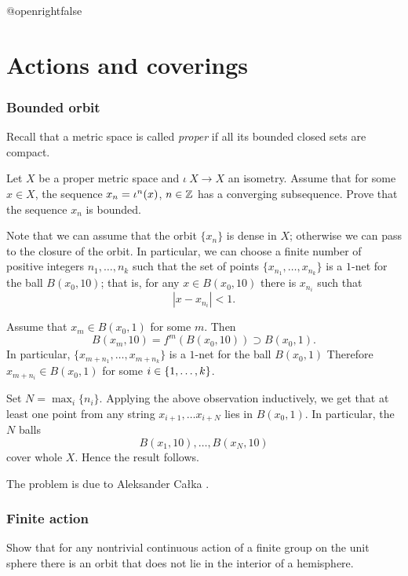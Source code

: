 \csname @openrightfalse\endcsname
\chapter{Actions and coverings}

\subsection*{Bounded orbit}
\label{Bounded orbit}

Recall that a metric space is called \emph{proper} if all its bounded closed sets are compact.

\begin{pr} Let $X$ be a 
proper metric space 
and $\iota\:X\to X$ an isometry.
Assume that for some $x\in X$, the sequence $x_n\z=\iota^n(x)$, $n\in\mathbb{Z}$ has a converging subsequence.
Prove that the sequence $x_n$ is bounded.
\end{pr}

Note that we can assume that the orbit $\{x_n\}$ is dense in $X$;
otherwise we can pass to the closure of the orbit.
In particular, we can choose a finite number of positive integers $n_1,\dots,n_k$
such that the set of points $\{x_{n_1},\dots,x_{n_k}\}$ is a $1$-net for the ball $B(x_0,10)$;
that is, for any $x\in B(x_0,10)$ there is $x_{n_i}$ such that
\[|x-x_{n_i}|<1.\]

Assume that $x_m\in B(x_0,1)$ for some $m$.
Then 
\[B(x_m,10)=f^m( B(x_0,10))\supset B(x_0,1).\] 
In particular, $\{x_{m+n_1},\dots,x_{m+n_k}\}$ is a $1$-net for the ball $B(x_0,1)$
Therefore $x_{m+n_i}\in B(x_0,1)$ for some $i\z\in\{1,\dots,k\}$.

Set $N=\max_i\{n_i\}$.
Applying the above observation inductively, we get that at least one point from any string $x_{i+1},\dots x_{i+N}$ lies in $B(x_0,1)$.
In particular, the $N$ balls
\[B(x_1,10),\dots,B(x_N,10)\]
cover whole $X$.
Hence the result follows.\qeds

The problem is due to Aleksander Ca{\l}ka \cite{calka}.

\subsection*{Finite action}\label{Finite action}

\begin{pr}
Show that for any nontrivial continuous action of a finite group on the unit sphere
there is an orbit that does not lie in the interior of a hemisphere.
\end{pr}


